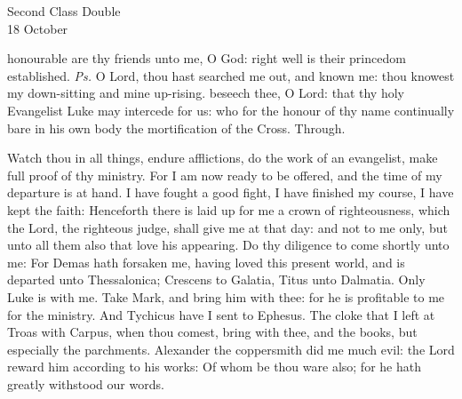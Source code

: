 \begin{inhead}
    {Second Class Double\\
18 October}
\end{inhead}

\introit
{} honourable are thy friends unto me, O God: right well is their princedom established. \textit{Ps.} O Lord, thou hast searched me out, and known me: thou knowest my down-sitting and mine up-rising.
\collect
 beseech thee, O Lord: that thy holy Evangelist Luke may intercede for us: who for the honour of thy name continually bare in his own body the mortification of the Cross. Through.

 Watch thou in all things, endure afflictions, do the work of an evangelist, make full proof of thy ministry. For I am now ready to be offered, and the time of my departure is at hand. I have fought a good fight, I have finished my course, I have kept the faith: Henceforth there is laid up for me a crown of righteousness, which the Lord, the righteous judge, shall give me at that day: and not to me only, but unto all them also that love his appearing. Do thy diligence to come shortly unto me: For Demas hath forsaken me, having loved this present world, and is departed unto Thessalonica; Crescens to Galatia, Titus unto Dalmatia. Only Luke is with me. Take Mark, and bring him with thee: for he is profitable to me for the ministry. And Tychicus have I sent to Ephesus. The cloke that I left at Troas with Carpus, when thou comest, bring with thee, and the books, but especially the parchments. Alexander the coppersmith did me much evil: the Lord reward him according to his works: Of whom be thou ware also; for he hath greatly withstood our words.


